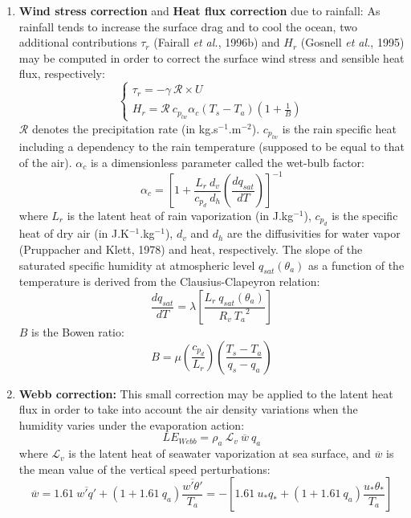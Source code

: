 \begin{enumerate}
	\item \textbf{Wind stress correction} and \textbf{Heat flux correction} due to rainfall:
As rainfall tends to increase the surface drag and to cool the ocean, two additional contributions 
$\tau_{r}$ (Fairall \textit{et al.}, 1996b) %
and $H_{r}$ (Gosnell \textit{et al.}, 1995) %
may be computed in order to correct the surface wind stress and sensible heat flux, respectively:
\begin{equation}
\left\{
\begin{array}{l}
	{\tau}_r=-\gamma~\mathcal{R} \times U\\
	H_r={\mathcal{R}}~{c_{p_{\mathit{lw}}}} {\alpha}_c (T_s-T_a)\left(1+\frac{1}{B}\right)
\end{array}
\right.
\end{equation}
$\mathcal{R}$ denotes the precipitation rate (in kg.s$^{-1}$.m$^{-2}$).
$c_{p_{\mathit{lw}}}$ is the rain specific heat including a dependency to the rain temperature (supposed to be equal to that of the air).
${\alpha}_c$ is a dimensionless parameter called the wet-bulb factor:
\begin{equation}
	{\alpha}_c=\left[1+ \frac{L_r~d_v}{c_{p_d}~d_h} \left(\frac{dq_{\mathit{sat}}}{dT}\right) \right]^{-1}
\end{equation}
where $L_r$ is the latent heat of rain vaporization (in J.kg$^{-1}$), 
$c_{p_d}$ is the specific heat of dry air (in J.K$^{-1}$.kg$^{-1}$),
$d_v$ and $d_h$ are the diffusivities for water vapor (Pruppacher and Klett, 1978) and heat, respectively.
The slope of the saturated specific humidity at atmospheric level $q_{\mathit{sat}}({\theta}_a)$ as a function of the temperature 
is derived from the Clausius-Clapeyron relation:
		$$\frac{dq_{\mathit{sat}}}{dT}=\lambda \left[ \frac{L_r~q_{\mathit{sat}}({\theta}_a)}{R_v~{T_a}^{2}}\right]$$
$B$ is the Bowen ratio:
	$$B= \mu \left(\frac{c_{p_d}}{L_r}\right) \left(\frac{T_s-T_a}{q_s-q_a}\right)$$

	\item \textbf{Webb correction:}
This small correction may be applied to the latent heat flux in order to take into account the air density variations when the humidity 
varies under the evaporation action:
$$LE_{\mathit{Webb}}=\rho_{a}~{\mathcal{L}}_{v}~\overline{w}~q_a$$
where ${\mathcal{L}}_{v}$ is the latent heat of seawater vaporization at sea surface, and $\overline{w}$ is the mean value of the vertical 
speed perturbations: 
$$ \overline{w} = 1.61~\overline{w'q'}+(1+1.61~q_a)\frac{\overline{w'{\theta}'}}{T_a} = -\left[1.61~u_* q_*+(1+1.61~q_a)\frac{u_* {\theta}_*}{T_a}\right] $$

\end{enumerate}

